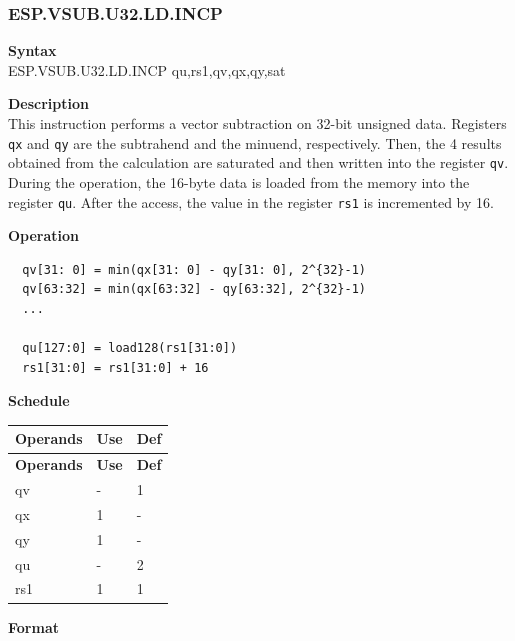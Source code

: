 \newpage
\subsubsection{ESP.VSUB.U32.LD.INCP}\label{instruction:ESPVSUBU32LDINCP}
\textbf{Syntax}\\
ESP.VSUB.U32.LD.INCP qu,rs1,qv,qx,qy,sat

\textbf{Description}\\
This instruction performs a vector subtraction on 32-bit unsigned data. Registers \lstinline{qx} and \lstinline{qy} are the subtrahend and the minuend, respectively. Then, the 4 results obtained from the calculation are saturated and then written into the register \lstinline{qv}. \\ During the operation, the 16-byte data is loaded from the memory into the register \lstinline{qu}. After the access, the value in the register \lstinline{rs1} is incremented by 16.

\textbf{Operation}\\
\begin{lstlisting}
  qv[31: 0] = min(qx[31: 0] - qy[31: 0], 2^{32}-1)
  qv[63:32] = min(qx[63:32] - qy[63:32], 2^{32}-1)
  ...

  qu[127:0] = load128(rs1[31:0])
  rs1[31:0] = rs1[31:0] + 16
\end{lstlisting}

\textbf{Schedule}\\
\begin{longtable}[c]{|l|l|l|}
    \hline
    \rowcolor{lightgray}
    \textbf{Operands} & \textbf{Use} & \textbf{Def} \\\hline
    \endfirsthead
    \hline
    \rowcolor{lightgray}
     \textbf{Operands} & \textbf{Use} & \textbf{Def} \\\hline
    \endhead
    \hline
    \endfoot

  qv & - & 1 \\\hline
    qx & 1 & - \\\hline
    qy & 1 & - \\\hline
    qu & - & 2 \\\hline
    rs1 & 1 & 1

\end{longtable}

\textbf{Format}\\

